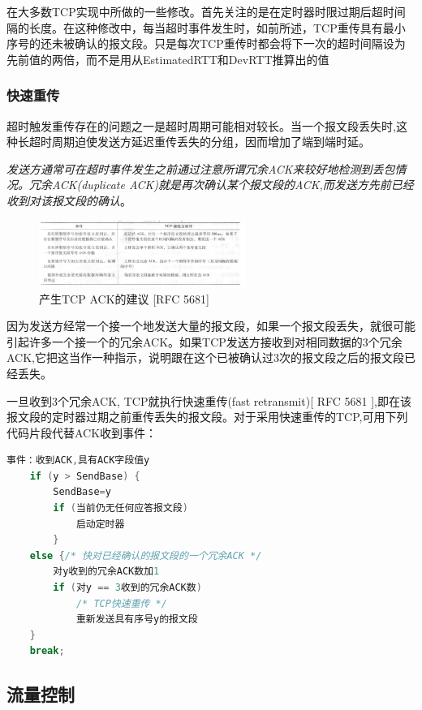     在大多数TCP实现中所做的一些修改。首先关注的是在定时器时限过期后超时间隔的长度。在这种修改中，每当超时事件发生时，如前所述，TCP重传具有最小序号的还未被确认的报文段。只是每次TCP重传时都会将下一次的超时间隔设为先前值的两倍，而不是用从EstimatedRTT和DevRTT推算出的值

\subsubsection{快速重传}

    超时触发重传存在的问题之一是超时周期可能相对较长。当一个报文段丢失时,这种长超时周期迫使发送方延迟重传丢失的分组，因而增加了端到端时延。

    \emph{发送方通常可在超时事件发生之前通过注意所谓冗余ACK来较好地检测到丢包情况。冗余ACK(duplicate ACK)就是再次确认某个报文段的ACK,而发送方先前已经收到对该报文段的确认}。

\begin{figure}[!htbp]
    \centering
    \includegraphics[width=0.6\textwidth]{image/chapter03/产生TCP ACK的建议.png}
    \caption{产生TCP ACK的建议 [RFC 5681]}
\end{figure}

    因为发送方经常一个接一个地发送大量的报文段，如果一个报文段丢失，就很可能引起许多一个接一个的冗余ACK。如果TCP发送方接收到对相同数据的3个冗余ACK,它把这当作一种指示，说明跟在这个已被确认过3次的报文段之后的报文段已经丢失。

    一旦收到3个冗余ACK, TCP就执行快速重传(fast retransmit)[ RFC 5681 ],即在该报文段的定时器过期之前重传丢失的报文段。对于采用快速重传的TCP,可用下列代码片段代替ACK收到事件： 

\begin{lstlisting}[language=C++, caption={针对快速重传的机制}]
事件：收到ACK,具有ACK字段值y
    if (y > SendBase) {
        SendBase=y
        if (当前仍无任何应答报文段)
            启动定时器
        }
    else {/* 快对已经确认的报文段的一个冗余ACK */
        对y收到的冗余ACK数加1
        if (对y == 3收到的冗余ACK数)
            /* TCP快速重传 */ 
            重新发送具有序号y的报文段
    }
    break;
\end{lstlisting}

\subsection{流量控制}

